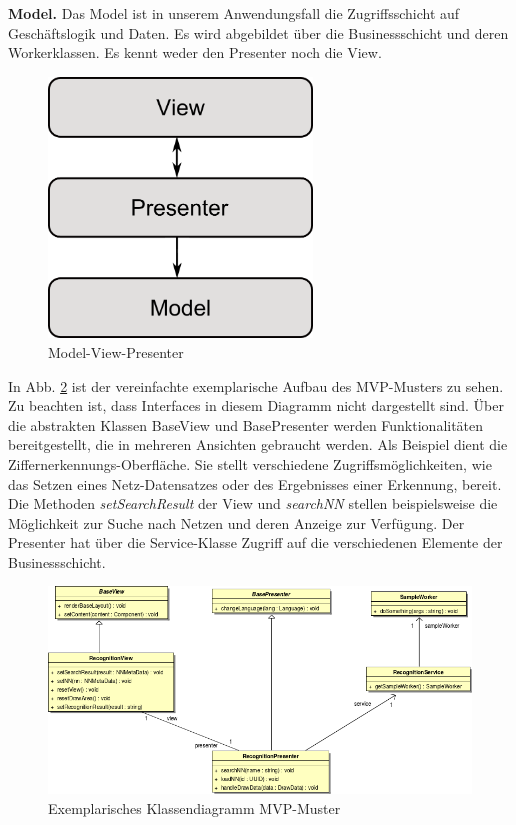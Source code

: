 \textbf{Model.} Das Model ist in unserem Anwendungsfall die Zugriffsschicht auf Geschäftslogik und Daten. Es wird abgebildet über die Businessschicht und deren Workerklassen. Es kennt weder den Presenter noch die View.

\begin{figure}[H]
	\begin{center}
		\includegraphics[width=7cm]{Abbildungen/UML/daniel/MVP.png}
		\caption{Model-View-Presenter} 
		\label{mvp}
	\end{center}
\end{figure}

In Abb. \ref{mvp-exemplarisch} ist der vereinfachte exemplarische Aufbau des MVP-Musters zu sehen. Zu beachten ist, dass Interfaces in diesem Diagramm nicht dargestellt sind. Über die abstrakten Klassen BaseView und BasePresenter werden Funktionalitäten bereitgestellt, die in mehreren Ansichten gebraucht werden. Als Beispiel dient die Ziffernerkennungs-Oberfläche. Sie stellt verschiedene Zugriffsmöglichkeiten, wie das Setzen eines Netz-Datensatzes oder des Ergebnisses einer Erkennung, bereit. Die Methoden \textit{setSearchResult} der View und \textit{searchNN} stellen beispielsweise die Möglichkeit zur Suche nach Netzen und deren Anzeige zur Verfügung. Der Presenter hat über die Service-Klasse Zugriff auf die verschiedenen Elemente der Businessschicht. 

\begin{figure}[H]
	\centering
	\includegraphics[width=1\textwidth]{Abbildungen/UML/daniel/Klassendiagramm-MVP.png}
	\caption{Exemplarisches Klassendiagramm MVP-Muster}
	\label{mvp-exemplarisch}
\end{figure}


